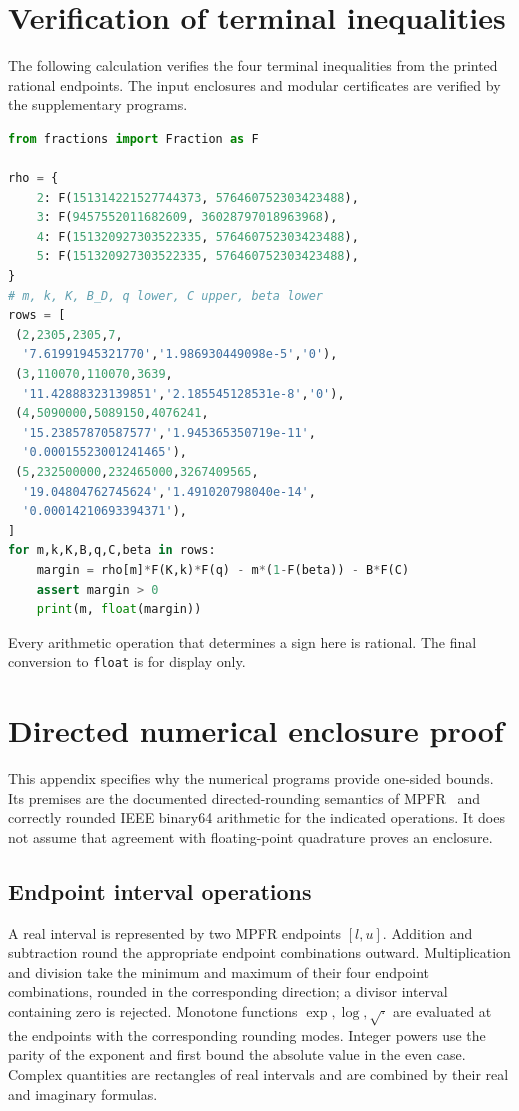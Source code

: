 \documentclass[11pt,a4paper]{article}
\theoremstyle{definition}\newtheorem{definition}[theorem]{Definition}
\theoremstyle{remark}\newtheorem{remark}[theorem]{Remark}
\numberwithin{equation}{section}
\begin{document}
\clearpage
\appendix
\section{Verification of terminal inequalities}\label{app:shortcheck}
The following calculation verifies the four terminal inequalities from the printed rational endpoints. The input enclosures and modular certificates are verified by the supplementary programs.
\begin{lstlisting}[language=Python]
from fractions import Fraction as F

rho = {
    2: F(151314221527744373, 576460752303423488),
    3: F(9457552011682609, 36028797018963968),
    4: F(151320927303522335, 576460752303423488),
    5: F(151320927303522335, 576460752303423488),
}
# m, k, K, B_D, q lower, C upper, beta lower
rows = [
 (2,2305,2305,7,
  '7.61991945321770','1.986930449098e-5','0'),
 (3,110070,110070,3639,
  '11.42888323139851','2.185545128531e-8','0'),
 (4,5090000,5089150,4076241,
  '15.23857870587577','1.945365350719e-11',
  '0.00015523001241465'),
 (5,232500000,232465000,3267409565,
  '19.04804762745624','1.491020798040e-14',
  '0.00014210693394371'),
]
for m,k,K,B,q,C,beta in rows:
    margin = rho[m]*F(K,k)*F(q) - m*(1-F(beta)) - B*F(C)
    assert margin > 0
    print(m, float(margin))
\end{lstlisting}
Every arithmetic operation that determines a sign here is rational. The final conversion to \texttt{float} is for display only.

\clearpage
\section{Directed numerical enclosure proof}\label{app:numerical-proof}
This appendix specifies why the numerical programs provide one-sided bounds. Its premises are the documented directed-rounding semantics of MPFR~\cite{mpfr} and correctly rounded IEEE binary64 arithmetic for the indicated operations. It does not assume that agreement with floating-point quadrature proves an enclosure.

\subsection{Endpoint interval operations}
A real interval is represented by two MPFR endpoints $[l,u]$. Addition and subtraction round the appropriate endpoint combinations outward. Multiplication and division take the minimum and maximum of their four endpoint combinations, rounded in the corresponding direction; a divisor interval containing zero is rejected. Monotone functions $\exp,\log,\sqrt{\cdot}$ are evaluated at the endpoints with the corresponding rounding modes. Integer powers use the parity of the exponent and first bound the absolute value in the even case. Complex quantities are rectangles of real intervals and are combined by their real and imaginary formulas.
\end{document}
